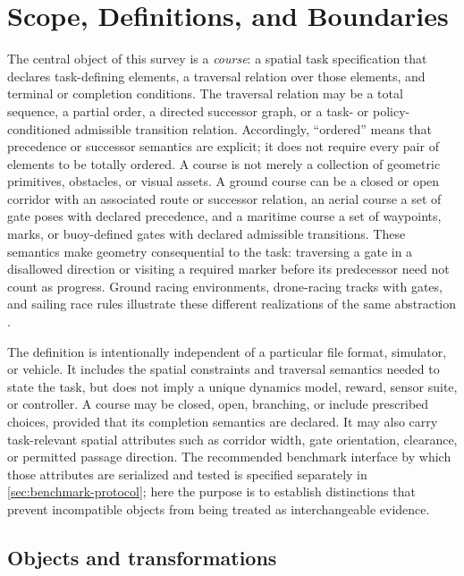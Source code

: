 \section{Scope, Definitions, and Boundaries}
\label{sec:scope-definitions}

The central object of this survey is a \emph{course}: a spatial task specification
that declares task-defining elements, a traversal relation over those elements, and
terminal or completion conditions. The traversal relation may be a total sequence,
a partial order, a directed successor graph, or a task- or policy-conditioned
admissible transition relation. Accordingly, ``ordered'' means that precedence or
successor semantics are explicit; it does not require every pair of elements to be
totally ordered. A course is not merely a collection of geometric primitives,
obstacles, or visual assets. A ground course can be a closed or open corridor with
an associated route or successor relation, an aerial course a set of gate poses with
declared precedence, and a maritime course a set of waypoints, marks, or buoy-defined
gates with declared admissible transitions. These semantics make geometry
consequential to the task: traversing a gate in a disallowed direction or visiting a
required marker before its predecessor need not count as progress. Ground racing
environments, drone-racing tracks with gates, and sailing race rules illustrate
these different realizations of the same abstraction
\cite{KlimovNodateCarRacing,Kaufmann2018DeepDrone,WRSCIRSCOrganizingCommittee2019WorldRobotic}.

The definition is intentionally independent of a particular file format, simulator,
or vehicle. It includes the spatial constraints and traversal semantics needed to
state the task, but does not imply a unique dynamics model, reward, sensor suite,
or controller. A course may be closed, open, branching, or include prescribed
choices, provided that its completion semantics are declared. It may also carry
task-relevant spatial attributes such as corridor width, gate orientation, clearance,
or permitted passage direction. The recommended benchmark interface by which those
attributes are serialized and tested is specified separately in
\cref{sec:benchmark-protocol}; here the purpose is to establish distinctions that
prevent incompatible objects from being treated as interchangeable evidence.

\subsection{Objects and transformations}

